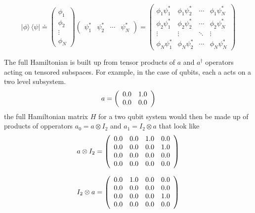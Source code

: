 \documentclass{article}
\begin{document}
$$
|\phi \rangle \, \langle \psi | \doteq 
\begin{pmatrix} \phi_1 \\ \phi_2 \\ \vdots \\ \phi_N \end{pmatrix}
\begin{pmatrix} \psi_1^* & \psi_2^* & \cdots & \psi_N^* \end{pmatrix}
= \begin{pmatrix}
\phi_1 \psi_1^* & \phi_1 \psi_2^* & \cdots & \phi_1 \psi_N^* \\
\phi_2 \psi_1^* & \phi_2 \psi_2^* & \cdots & \phi_2 \psi_N^* \\
\vdots & \vdots & \ddots & \vdots \\
\phi_N \psi_1^* & \phi_N \psi_2^* & \cdots & \phi_N \psi_N^* \end{pmatrix}
$$

The full Hamiltonian is built up from tensor products of $a$ and $a^\dagger$ operators acting on tensored subspaces.  For example, in the case of qubits, each a acts on a two level subsystem. 
\begin{equation*}a = \left(\begin{array}{*{11}c}0.0 & 1.0\\0.0 & 0.0\\\end{array}\right)\end{equation*}
the full  Hamiltonian matrix $H$ for a two qubit system would then be made up of products of opperators
$a_0 = a \otimes I_2$ and $a_1 = I_2 \otimes a$ that look like
\begin{equation*}a \otimes I_2 = \left(\begin{array}{*{11}c}0.0 & 0.0 & 1.0 & 0.0\\0.0 & 0.0 & 0.0 & 1.0\\0.0 & 0.0 & 0.0 & 0.0\\0.0 & 0.0 & 0.0 & 0.0\\\end{array}\right)\end{equation*}

\begin{equation*}I_2 \otimes a = \left(\begin{array}{*{11}c}0.0 & 1.0 & 0.0 & 0.0\\0.0 & 0.0 & 0.0 & 0.0\\0.0 & 0.0 & 0.0 & 1.0\\0.0 & 0.0 & 0.0 & 0.0\\\end{array}\right)\end{equation*}
\end{document}
